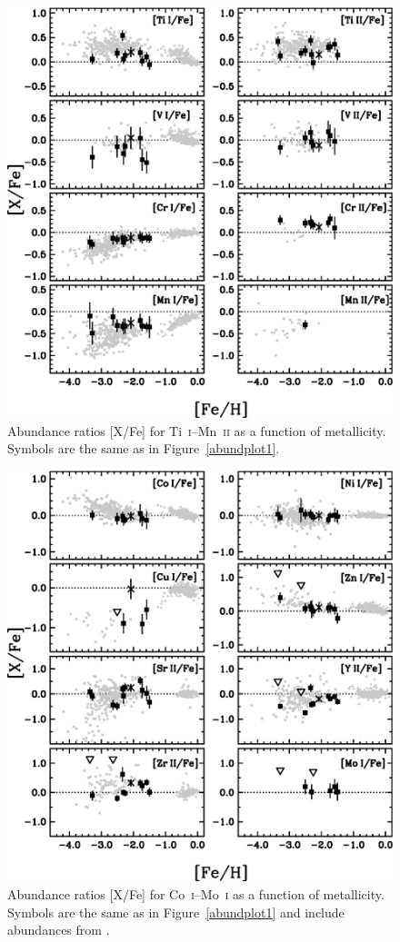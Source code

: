 \documentclass{emulateapj}
\begin{document}
\begin{figure}
\includegraphics[angle=0,width=7.0in]{fig07.eps}
\caption{
\label{abundplot2}
Abundance ratios [X/Fe] for Ti~\textsc{i}--Mn~\textsc{ii} 
as a function of metallicity.
Symbols are the same as in Figure~\ref{abundplot1}.
}
\end{figure}


\begin{figure}
\includegraphics[angle=0,width=7.0in]{fig08.eps}
\caption{
\label{abundplot3}
Abundance ratios [X/Fe] for Co~\textsc{i}--Mo~\textsc{i}
as a function of metallicity.
Symbols are the same as in Figure~\ref{abundplot1} and include
abundances from \citet{francois07}.
}
\end{figure}
\end{document}
